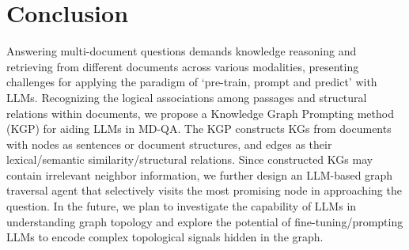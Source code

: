 \section{Conclusion}
Answering multi-document questions demands knowledge reasoning and retrieving from different documents across various modalities, presenting challenges for applying the paradigm of `pre-train, prompt and predict' with LLMs. Recognizing the logical associations among passages and structural relations within documents, we propose a Knowledge Graph Prompting method (KGP) for aiding LLMs in MD-QA. The KGP constructs KGs from documents with nodes as sentences or document structures, and edges as their lexical/semantic similarity/structural relations. Since constructed KGs may contain irrelevant neighbor information, we further design an LLM-based graph traversal agent that selectively visits the most promising node in approaching the question. In the future, we plan to investigate the capability of LLMs in understanding graph topology and explore the potential of fine-tuning/prompting LLMs to encode complex topological signals hidden in the graph.